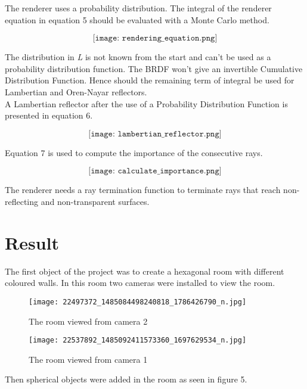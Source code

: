 \documentclass[a4paper,12pt,oneside,final]{report}
\begin{document}
The renderer uses a probability distribution. The integral of the renderer equation in equation 5 should be evaluated with a Monte Carlo method. 
\begin{center}
\begin{equation} \label{eq:solve}
\texttt{[image: rendering\_equation.png]}
\end{equation}
\end{center}
The distribution in \textit{L} is not known from the start and can't be used as a probability distribution function. 
The BRDF won't give an invertible Cumulative Distribution Function.
Hence should the remaining term of integral be used for Lambertian and Oren-Nayar reflectors.
\\
A Lambertian reflector after the use of a Probability Distribution Function is presented in equation 6.
\begin{center}
\begin{equation} \label{eq:solve}
\texttt{[image: lambertian\_reflector.png]}
\end{equation}
\end{center}
Equation 7 is used to compute the importance of the consecutive rays.
\begin{center}
\begin{equation} \label{eq:solve}
\texttt{[image: calculate\_importance.png]}
\end{equation}
\end{center}

The renderer needs a ray termination function to terminate rays that reach non-reflecting and non-transparent surfaces. 
\section{Result}
The first object of the project was to create a hexagonal room with different coloured walls. In this room two cameras were installed to view the room. 
\begin{figure}[h!]
\begin{center}
\texttt{[image: 22497372\_1485084498240818\_1786426790\_n.jpg]}
\end{center}
\caption{The room viewed from camera 2}
\end{figure}

\begin{figure}[h!]
\begin{center}
\texttt{[image: 22537892\_1485092411573360\_1697629534\_n.jpg]}
\end{center}
\caption{The room viewed from camera 1}
\end{figure}
Then spherical objects were added in the room as seen in figure 5. 
\end{document}
